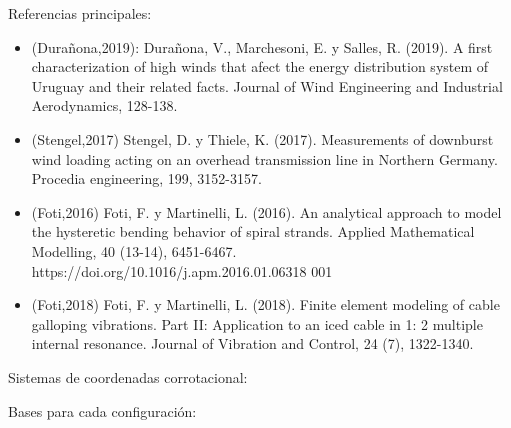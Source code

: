\documentclass[
  aspectratio=169,
]{beamer}
\begin{document}
\begin{small}
\begin{frame}{Referencias principales:}
	\begin{itemize}
		\item {\color{blue}(Durañona,2019)}: Durañona, V., Marchesoni, E. y Salles, R. (2019). A first characterization of high winds that afect the energy distribution system of Uruguay and their related facts. Journal of Wind Engineering and Industrial Aerodynamics, 128-138.
		\item{\color{blue}(Stengel,2017)} Stengel, D. y Thiele, K. (2017). Measurements of downburst wind loading acting on an overhead transmission line in Northern Germany. Procedia engineering, 199, 3152-3157.
 		\item {\color{blue}(Foti,2016)} Foti, F. y Martinelli, L. (2016). An analytical approach to model the hysteretic bending behavior of spiral strands. Applied Mathematical Modelling, 40 (13-14), 6451-6467. https://doi.org/10.1016/j.apm.2016.01.06318 001
 		\item {\color{blue}(Foti,2018)} Foti, F. y Martinelli, L. (2018). Finite element modeling of cable galloping vibrations. Part II: Application to an iced cable in 1: 2 multiple internal resonance. Journal of Vibration and Control, 24 (7), 1322-1340.
	\end{itemize}
\end{frame}
\begin{frame}{Sistemas de coordenadas corrotacional:}{}
	\begin{minipage}[t]{0.5\linewidth}
	\begin{figure}[htbp]
	\centering
	\def\svgwidth{60mm}
	
\end{figure}
	\end{minipage}\hfill
	\begin{minipage}[t]{0.5\linewidth}
\begin{block}{Bases para cada configuración:}

\end{block}
\end{minipage}
\end{frame}
\end{small}
\end{document}
